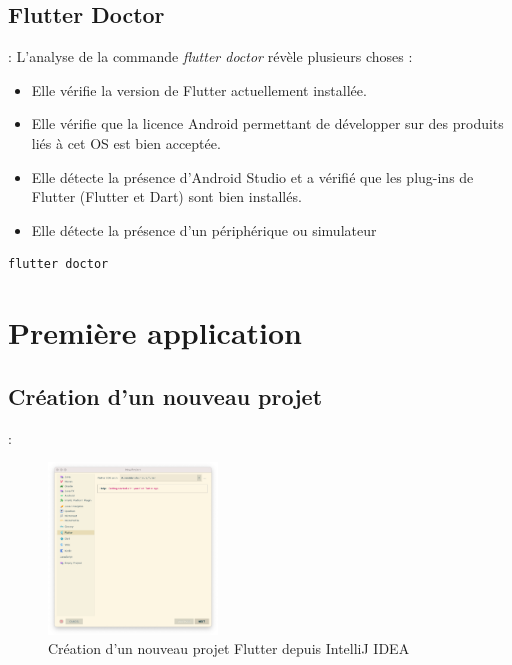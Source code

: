 \documentclass[10pt]{beamer}
\begin{document}
\subsection{Flutter Doctor}
\begin{frame}[fragile,t]{\secname : \subsecname}
    L’analyse de la commande \textit{flutter doctor} révèle plusieurs choses :
    \begin{itemize}
        \item Elle vérifie la version de Flutter actuellement installée.
        \item Elle vérifie que la licence Android permettant de développer sur des produits liés à cet OS est bien acceptée.
        \item Elle détecte la présence d’Android Studio et a vérifié que les plug-ins de Flutter (Flutter et Dart) sont bien installés.
        \item Elle détecte la présence d'un périphérique ou simulateur
    \end{itemize}
    \begin{lstlisting}[caption={Vérifier l'installation},language=bash, label=getversion]
        flutter doctor
        \end{lstlisting}
\end{frame}

\section{Première application}
\subsection{Création d'un nouveau projet}
\begin{frame}[fragile,t]{\secname : \subsecname}
    \begin{figure}[H]
        \begin{center}
            \includegraphics[width=0.4\textwidth]{../assets/img/new-project-1.jpg}
            \caption*{Création d'un nouveau projet Flutter depuis IntelliJ IDEA}
            \label{Fig:new-project-1}
        \end{center}
    \end{figure}
\end{frame}
\end{document}
